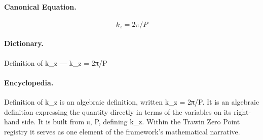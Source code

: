 \paragraph{Canonical Equation.}
\[
k_z = 2\pi/P
\]

\paragraph{Dictionary.}
Definition of k\_z — k\_z = 2π/P

\paragraph{Encyclopedia.}
Definition of k\_z is an algebraic definition, written k\_z = 2π/P. It is an algebraic definition expressing the quantity directly in terms of the variables on its right-hand side. It is built from π, P, defining k\_z. Within the Trawin Zero Point registry it serves as one element of the framework's mathematical narrative.
